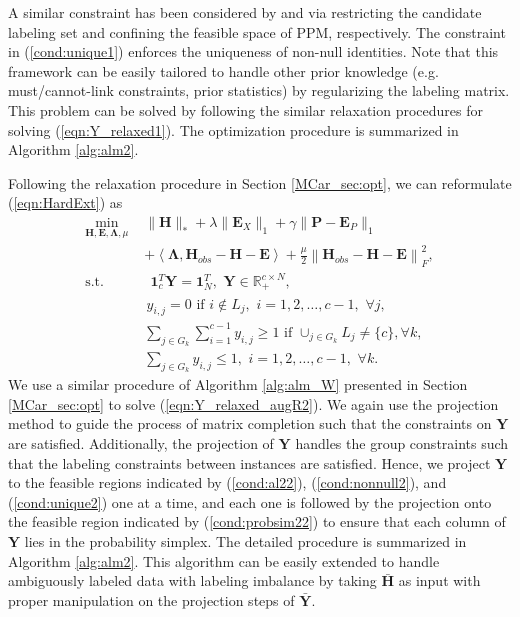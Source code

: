 \documentclass[10pt,journal,compsoc]{IEEEtran}
\begin{document}
 A similar constraint has been considered by \cite{Luo2010} and \cite{Zeng2013} via restricting the candidate labeling set and confining the feasible space of PPM, respectively. The constraint in (\ref{cond:unique1}) enforces the uniqueness of non-null identities. Note that this framework can be easily tailored to handle other prior knowledge (e.g. must/cannot-link constraints, prior statistics) by regularizing the labeling matrix. This problem can be solved by following the similar relaxation procedures for solving (\ref{eqn:Y_relaxed1}). The optimization procedure is summarized in Algorithm \ref{alg:alm2}.



Following the relaxation procedure in Section \ref{MCar_sec:opt}, we can reformulate (\ref{eqn:HardExt}) as
\begin{align}
\min_{\mathbf{H},\mathbf{E}, \mathbf{\Lambda}, \mu} \,\,&   \| \mathbf{H} \|_*  + \lambda \|\mathbf{E}_X\|_1  +  \gamma \|\mathbf{P} -\mathbf{E}_P\|_1 \nonumber \\
& + \left \langle  \mathbf{\Lambda} ,
\mathbf{H}_{obs} -\mathbf{H}
-
\mathbf{E}
 \right \rangle  + \frac{\mu}{2} \left\|
\mathbf{H}_{obs} - \mathbf{H}
 -
\mathbf{E}
 \right\|_F^2, \label{eqn:Y_relaxed_augR2} \\
\text{s.t.}
&\,\; \mathbf{1}^T_c \mathbf{Y} = \mathbf{1}^T_N, \,\, \mathbf{Y} \in \mathbb{R}_+^{c \times N}, \label{cond:probsim22}\\
&\, y_{i,j} = 0 \,\, \mathrm{if}  \,\, i \notin L_j, \,\, i = 1, 2,  \dots, c-1, \,\, \forall j, \label{cond:al22}\\
&\sum_{j \in G_k}  \sum_{i=1}^{c-1} y_{i,j}  \geq 1 \,\, \mathrm{if} \,\,  \mathop{\cup}_{j \in G_k} L_j \neq \{c\}, \forall k, \label{cond:nonnull2} \\
& \sum_{j \in G_k} y_{i,j}  \leq 1, \,\, i = 1, 2, \dots, c-1, \,\,  \forall k. \label{cond:unique2}
\end{align}
We use a similar procedure of Algorithm \ref{alg:alm_W} presented in Section \ref{MCar_sec:opt} to solve (\ref{eqn:Y_relaxed_augR2}). We again use the projection method to guide the process of matrix completion such that the constraints on $\mathbf{Y}$ are satisfied. Additionally, the projection of $\mathbf{Y}$ handles the group constraints such that the labeling constraints between instances are satisfied. Hence, we project $\mathbf{Y}$ to the feasible regions indicated by (\ref{cond:al22}), (\ref{cond:nonnull2}), and (\ref{cond:unique2}) one at a time, and each one is followed by the projection onto the feasible region indicated by (\ref{cond:probsim22}) to ensure that each column of $\mathbf{Y}$ lies in the probability simplex.
The detailed procedure is summarized in Algorithm \ref{alg:alm2}. This algorithm can be easily extended to handle ambiguously labeled data with labeling imbalance by taking $\bar{\mathbf{H}}$ as input with proper manipulation on the projection steps of $\bar{\mathbf{Y}}$.%
\end{document}
